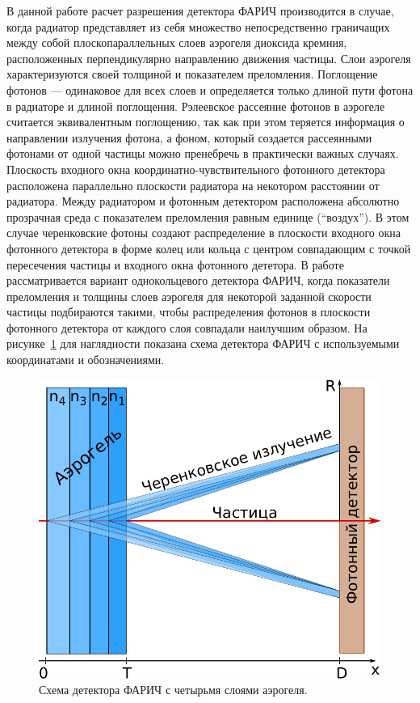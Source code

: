 \documentclass[12pt]{article}
\begin{document}
В данной работе расчет разрешения детектора ФАРИЧ производится в случае, когда радиатор представляет из себя множество непосредственно граничащих между 
собой плоскопараллельных слоев аэрогеля диоксида кремния, расположенных перпендикулярно направлению движения частицы. Слои аэрогеля характеризуются своей 
толщиной и показателем преломления. Поглощение фотонов --- одинаковое для всех слоев и определяется только длиной пути фотона в радиаторе и длиной поглощения. 
Рэлеевское рассеяние фотонов в аэрогеле считается эквивалентным поглощению, 
так как при этом теряется информация о направлении излучения фотона, а фоном, который создается рассеянными фотонами от одной частицы можно пренебречь в практически важных случаях. 
Плоскость входного окна координатно-чувствительного фотонного детектора расположена параллельно плоскости радиатора на некотором расстоянии от радиатора. 
Между радиатором и фотонным детектором расположена абсолютно прозрачная среда с показателем преломления равным единице (``воздух''). 
В этом случае черенковские фотоны создают распределение в плоскости входного окна фотонного детектора в форме колец или кольца с центром 
совпадающим с точкой пересечения частицы и входного окна фотонного дететора. 
В работе рассматривается вариант однокольцевого детектора ФАРИЧ, когда показатели преломления и толщины 
слоев аэрогеля для некоторой заданной скорости частицы подбираются такими, чтобы распределения фотонов в плоскости фотонного 
детектора от каждого слоя совпадали наилучшим образом. На рисунке~\ref{fig:farich} для наглядности показана схема детектора ФАРИЧ с 
используемыми координатами и обозначениями.

\begin{figure}[htb]
\begin{center}
\includegraphics[width=0.4\textheight]{farich_scheme.pdf}
\caption{\small Схема детектора ФАРИЧ с четырьмя слоями аэрогеля.}
\label{fig:farich}
\end{center}
\end{figure}
\end{document}
